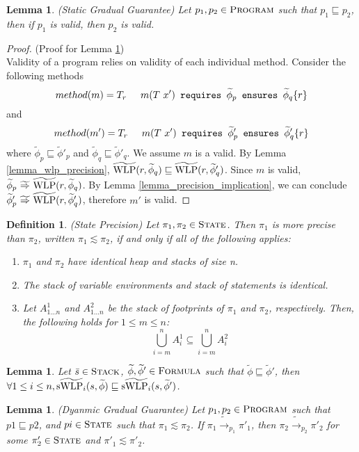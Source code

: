 \documentclass {article}
\newtheorem{lemma}[theorem]{Lemma}
\newtheorem{definition}[theorem]{Definition}
\newcommand{\tphi}{\widetilde{\phi}}
\newcommand{\timp}{\ \widetilde{\Rightarrow}\ }
\newcommand{\twlp}[2]{\widetilde{\textup{WLP}}(#1,#2)}
\newcommand{\tswlpi}[2]{\widetilde{\textup{sWLP}_i}(#1,#2)}
\begin{document}
\begin{lemma} (Static Gradual Guarantee)
\label{lemma_static_grad_guarantee}
Let $p_1, p_2 \in \textsc{Program}$ such that $p_1 \sqsubseteq p_2$, then if $p_1$ is valid, then $p_2$ is valid.
\end{lemma}
\begin{proof} (Proof for Lemma \ref{lemma_static_grad_guarantee})\\
Validity of a program relies on validity of each individual method. Consider the following methods $$method(m) = T_r \hspace{5mm} m(T\text{ }x') \texttt{\textup{ requires }} \tphi_p \texttt{\textup{ ensures }} \tphi_q \{r\} $$ and $$method(m') = T_r \hspace{5mm} m(T\text{ }x') \texttt{\textup{ requires }} \tphi'_p \texttt{\textup{ ensures }} \tphi'_q \{r\} $$ where $\tphi_p \sqsubseteq \tphi'_p$ and $\tphi_q \sqsubseteq \tphi'_q$. We assume $m$ is a valid. By Lemma \ref{lemma_wlp_precision}, $\twlp{r}{\tphi_q} \sqsubseteq \twlp{r}{\tphi'_q}$. Since $m$ is valid, $\tphi_p \timp \twlp{r}{\tphi_q}$. By Lemma \ref{lemma_precision_implication}, we can conclude $\tphi'_p \timp \twlp{r}{\tphi'_q}$, therefore $m'$ is valid.
\end{proof}

\begin{definition} (State Precision)
Let $\pi_1, \pi_2 \in \textsc{State}$. Then $\pi_1$ is more precise than $\pi_2$, written $\pi_1 \lesssim \pi_2$, if and only if all of the following applies:
\begin{enumerate}
    \item $\pi_1$ and $\pi_2$ have identical heap and stacks of size n.
    \item The stack of variable environments and stack of statements is identical.
    \item Let $A^1_{1...n}$ and $A^2_{1...n}$ be the stack of footprints of $\pi_1$ and $\pi_2$, respectively. Then, the following holds for $1 \leq m \leq n$: $$\bigcup_{i = m}^n A^1_i \subseteq \bigcup_{i=m}^n A^2_i$$
\end{enumerate}
\end{definition}
\begin{lemma}
\label{lemma_swlp_precision}
Let $\bar{s} \in \textsc{Stack}$, $\tphi, \tphi' \in \textsc{Formula}$ such that $\tphi \sqsubseteq \tphi'$, then $\forall 1 \leq i \leq n, \tswlpi{s}{\tphi} \sqsubseteq \tswlpi{s}{\tphi'}$.

\end{lemma}
\begin{lemma} (Dyanmic Gradual Guarantee)
\label{dynamic_grad_guarantee}
Let $p_1, p_2 \in \textsc{Program}$ such that $p1 \sqsubseteq p2$, and $pi \in \textsc{State}$ such that $\pi_1 \lesssim \pi_2$. If $\pi_1 \widetilde{\rightarrow}_{p_1} \pi'_1$, then $\pi_2 \widetilde{\rightarrow}_{p_2} \pi'_2$ for some $\pi'_2 \in \textsc{State}$ and $\pi'_1 \lesssim \pi'_2$.
\end{lemma}
\end{document}
